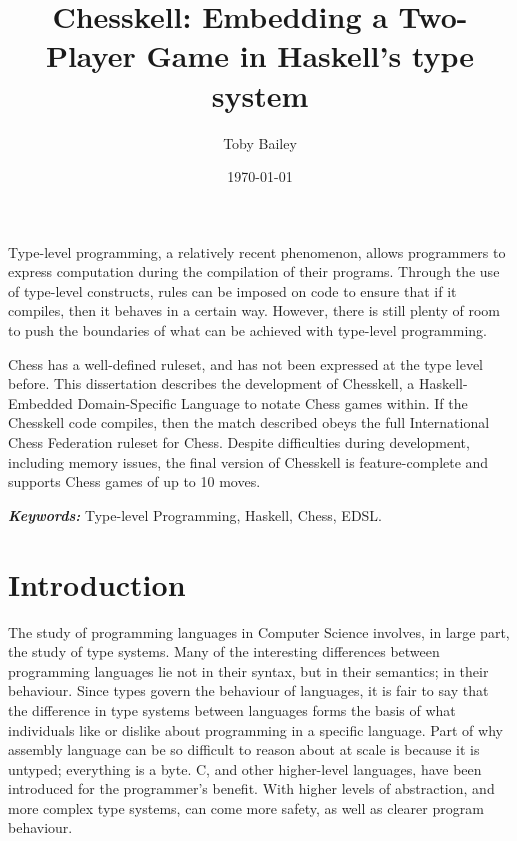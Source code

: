 \documentclass[12pt, a4paper, bibliography=totocnumbered]{scrreprt}
\title{Chesskell: Embedding a Two-Player Game in Haskell's type system}
\author{Toby Bailey}
\date{\today}
\renewenvironment{abstract}
 {\small
  \begin{center}
  \bfseries \textit{\abstractname}\vspace{-.5em}\vspace{0pt}
  \end{center}
  \quotation}
 {\endquotation}
\begin{document}
\begin{titlepage}
    \maketitle
\end{titlepage}

{}
\begin{abstract}
    Type-level programming, a relatively recent phenomenon, allows programmers to express computation during the compilation of their programs. Through the use of type-level constructs, rules can be imposed on code to ensure that if it compiles, then it behaves in a certain way. However, there is still plenty of room to push the boundaries of what can be achieved with type-level programming.

    Chess has a well-defined ruleset, and has not been expressed at the type level before. This dissertation describes the development of Chesskell, a Haskell-Embedded Domain-Specific Language to notate Chess games within. If the Chesskell code compiles, then the match described obeys the full International Chess Federation ruleset for Chess. Despite difficulties during development, including memory issues, the final version of Chesskell is feature-complete and supports Chess games of up to 10 moves.

    \textbf{\textit{Keywords:}} Type-level Programming, Haskell, Chess, EDSL.
\end{abstract}

{
\newpage  %
{}
\renewcommand{\normalfont}{\usekomafont{sectioning}}
}

\chapter{Introduction}

The study of programming languages in Computer Science involves, in large part, the study of type systems. Many of the interesting differences between programming languages lie not in their syntax, but in their semantics; in their behaviour. Since types govern the behaviour of languages, it is fair to say that the difference in type systems between languages forms the basis of what individuals like or dislike about programming in a specific language. Part of why assembly language can be so difficult to reason about at scale is because it is untyped; everything is a byte. C, and other higher-level languages, have been introduced for the programmer's benefit. With higher levels of abstraction, and more complex type systems, can come more safety, as well as clearer program behaviour.
\end{document}
